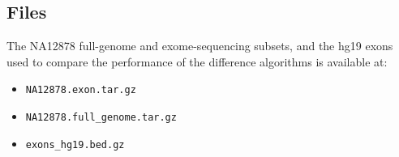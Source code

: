 \subsection{Files}

The NA12878 full-genome and exome-sequencing subsets, and the hg19 exons used to
compare the performance of the difference algorithms is available at:
\begin{itemize}
	\item {\tt NA12878.exon.tar.gz}
	\item {\tt NA12878.full\_genome.tar.gz}
	\item {\tt exons\_hg19.bed.gz}
\end{itemize}
